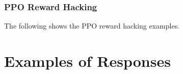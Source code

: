 \subsubsection{PPO Reward Hacking }
The following  shows the PPO reward hacking examples.
\label{appendix:reward_hacking_ppo}









\newpage
\section{Examples of Responses}

\label{Appendix:responses}



